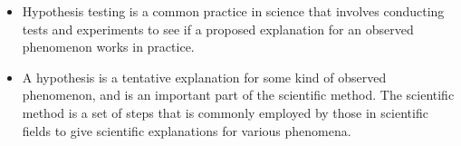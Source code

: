 \documentclass[12pt, a4paper]{article}
\begin{document}
\begin{itemize}

\item Hypothesis testing is a common practice in science that involves conducting tests and experiments to see if a proposed explanation for an observed phenomenon works in practice. 
\item A hypothesis is a tentative explanation for some kind of observed phenomenon, and is an important part of the scientific method. The scientific method is a set of steps that is commonly employed by those in scientific fields to give scientific explanations for various phenomena.






%

%
%




\end{itemize}
\end{document}
